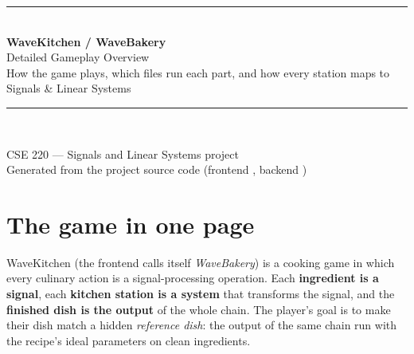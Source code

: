 \documentclass[11pt,a4paper]{article}
\begin{document}
\begin{titlepage}
\centering
\vspace*{2.5cm}
{\color{wkorange}\rule{\linewidth}{1.2pt}}\\[0.6cm]
{\Huge\bfseries\color{wkink} WaveKitchen / WaveBakery}\\[0.35cm]
{\LARGE\color{wkteal} Detailed Gameplay Overview}\\[0.3cm]
{\large How the game plays, which files run each part, and how every station maps to Signals \& Linear Systems}\\[0.6cm]
{\color{wkorange}\rule{\linewidth}{1.2pt}}\\[1.6cm]


\vfill
{\large CSE 220 --- Signals and Linear Systems project}\\[0.2cm]
{\color{wkgrey} Generated from the project source code (frontend , backend )}
\end{titlepage}

\tableofcontents
\newpage

\section{The game in one page}
WaveKitchen (the frontend calls itself \emph{WaveBakery}) is a cooking game in
which every culinary action is a signal-processing operation. Each
\textbf{ingredient is a signal}, each \textbf{kitchen station is a system}
that transforms the signal, and the \textbf{finished dish is the output} of the
whole chain. The player's goal is to make their dish match a hidden
\emph{reference dish}: the output of the same chain run with the recipe's ideal
parameters on clean ingredients.
\end{document}
